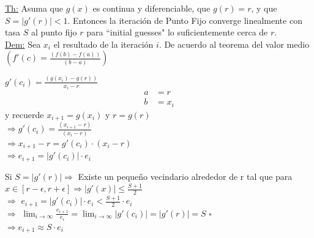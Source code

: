 \underline{Th:} Asuma que \(g(x)\) es continua y diferenciable, que \(g(r) = r\), y que \(S = |g'(r)| < 1\). Entonces la iteración de Punto Fijo converge linealmente con tasa \(S\) al punto fijo \(r\) para ``initial guesses" lo suficientemente cerca de $r$.\\
\vspace{0.2cm}
\underline{Dem:} Sea \(x_i\) el resultado de la iteración \(i\). De acuerdo al teorema del valor medio \(\left(f'(c) = \frac{(f(b) - f(a))}{(b-a)}\right)\)
\begin{center}
	\(g'(c_i) = \frac{(g(x_i) - g(r))}{x_i - r}\) \hspace{1cm} 
	\begin{equation*}
		\begin{aligned}
			a &= r \\ b &= x_i
		\end{aligned}
	\end{equation*}
	y recuerde \(x_{i+1} = g(x_i)\) y \(r = g(r)\)\\
	\vspace{0.2cm}
	$\Rightarrow g'(c_i) = \frac{(x_{i+1} - r)}{(x_{i} - r)}$\\
	\vspace{0.2cm}
	$\Rightarrow x_{i+1} - r = g'(c_i) \cdot (x_i - r)$\\
	\vspace{0.2cm}
	$\Rightarrow e_{i+1} = |g'(c_i)| \cdot e_i $\\
	\vspace{0.2cm}

	Si \(S = |g'(r)| \Rightarrow\) Existe un pequeño vecindario alrededor de r tal que para \(x \in [r - \epsilon, r + \epsilon] \Rightarrow |g'(x)| \leq \frac{S+1}{2}\) \\
	\vspace{1cm}
	$\Rightarrow$ \hspace{2cm} \(e_{i+1} = |g'(c_i)| \cdot e_i < \frac{S+1}{2} \cdot e_i\)\\
	\vspace{0.3cm}
	$\Rightarrow$ \hspace{1cm} \(\displaystyle\lim_{i \to \infty} \frac{e_{i+1}}{e_i} = \lim_{i \to 	\infty} |g'(c_i)| = |g'(r)| = S \) \hspace{0.5cm} $\square$ \\
	\vspace{1cm}
	$\Rightarrow e_{i+1} \approx S \cdot e_i$\\
	\vspace{1cm}
\end{center}

